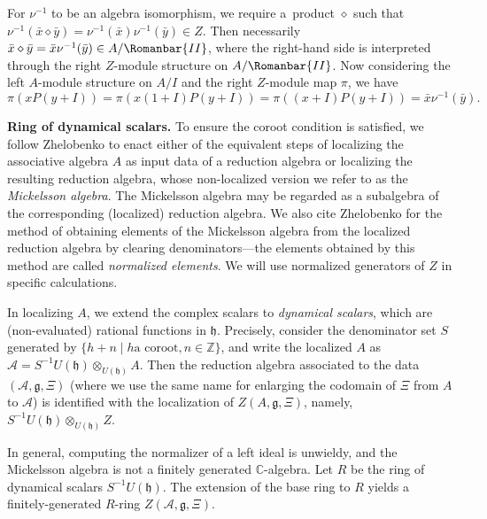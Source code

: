 \documentclass[pdftex]{sigma}
\numberwithin{equation}{section}
\begin{document}
\begin{Remark}
	For $\nu^{-1}$ to be an algebra isomorphism, we require a~product $\diamond$ such that $\nu^{-1}(\bar{x} \diamond \bar{y}) = \nu^{-1}(\bar{x})\nu^{-1}(\bar{y}) \in Z$. Then necessarily ${\bar{x} \diamond \bar{y} = \bar{x}\nu^{-1}(\bar{y}) \in A/\Romanbar{II}}$, where the right-hand side is interpreted through the right $Z$-module structure on $A/\Romanbar{II}$.
	Now considering the left $A$-module structure on $A/I$ and the right $Z$-module map $\pi$, we have
\[
\pi(xP(y+I)) = \pi(x(1+I)P(y+I)) = \pi((x+I)P(y+I)) = \bar{x}\nu^{-1}(\bar{y}).
\]
\end{Remark}

{\bf Ring of dynamical scalars.}
To ensure the coroot condition is satisfied, we follow Zhe\-lobenko \cite{zhelobenkoHypersymmetriesExtremalEquations1997} to enact either of the equivalent steps of localizing the associative algebra $A$ as input data of a reduction algebra or localizing the resulting reduction algebra, whose non-localized version we refer to as the \emph{Mickelsson algebra}. The Mickelsson algebra may be regarded as a subalgebra of the corresponding (localized) reduction algebra. We also cite Zhelobenko \cite[equation (4.16)]{zhelobenko1985gelfand} for the method of obtaining elements of the Mickelsson algebra from the localized reduction algebra by clearing denominators---the elements obtained by this method are called \emph{normalized elements}. We will use normalized generators of $Z$ in specific calculations.

In localizing $A$, we extend the complex scalars to \emph{dynamical scalars}, which are (non-evaluated) rational functions in $\mathfrak{h}$. Precisely, consider the denominator set $S$ generated by $\{h + n \mid h \allowbreak\text{a coroot}, n \in \mathbb{Z}\}$, and write the localized $A$ as $\mathscr{A} = S^{-1}U(\mathfrak{h}) \otimes_{U(\mathfrak{h})} A$. Then the reduction algebra associated to the data $(\mathscr{A},\mathfrak{g},\Xi)$ (where we use the same name for enlarging the codomain of $\Xi$ from $A$ to $\mathscr{A}$) is identified with the localization of $Z(A, \mathfrak{g}, \Xi)$, namely, $S^{-1}U(\mathfrak{h}) \otimes_{U(\mathfrak{h})} Z$.

In general, computing the normalizer of a left ideal is unwieldy, and the Mickelsson algebra is not a finitely generated $\mathbb{C}$-algebra. Let $R$ be the ring of dynamical scalars $S^{-1}U(\mathfrak{h})$. The extension of the base ring to $R$ yields a finitely-generated $R$-ring \cite[Definition 2.1]{bohmHopfAlgebroids2009} $Z(\mathscr{A}, \mathfrak{g}, \Xi)$.
\end{document}
